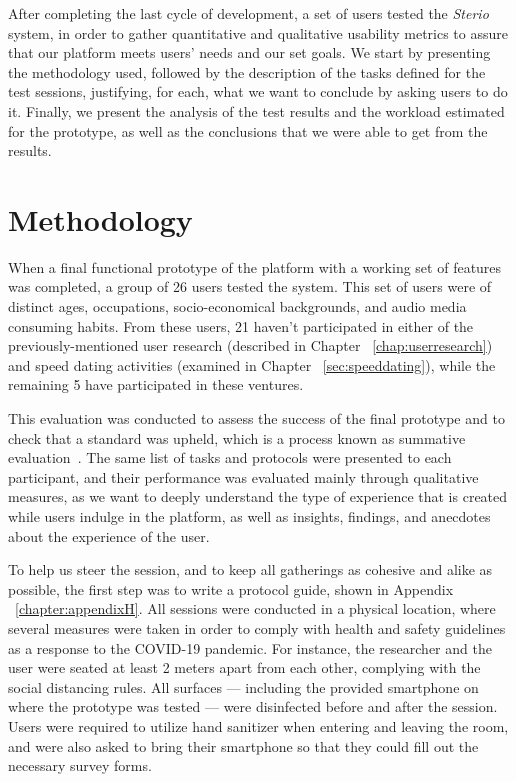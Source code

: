 \label{chap:evaluation}

After completing the last cycle of development, a set of users tested the \textit{Sterio} system, in order to gather quantitative and qualitative usability metrics to assure that our platform meets users’ needs and our set goals. We start by presenting the methodology used, followed by the description of the tasks defined for the test sessions, justifying, for each, what we want to conclude by asking users to do it. Finally, we present the analysis of the test results and the workload estimated for the prototype, as well as the conclusions that we were able to get from the results.


\section{Methodology}

When a final functional prototype of the platform with a working set of features was completed, a group of 26 users tested the system. This set of users were of distinct ages, occupations, socio-economical backgrounds, and audio media consuming habits. From these users, 21 haven't participated in either of the previously-mentioned user research (described in Chapter ~\ref{chap:userresearch}) and speed dating activities (examined in Chapter ~\ref{sec:speeddating}), while the remaining 5 have participated in these ventures.

This evaluation was conducted to assess the success of the final prototype and to check that a standard was upheld, which is a process known as summative evaluation~\cite{Preece2015, Courage2005}. The same list of tasks and protocols were presented to each participant, and their performance was evaluated mainly through qualitative measures, as we want to deeply understand the type of experience that is created while users indulge in the platform, as well as insights, findings, and anecdotes about the experience of the user.

To help us steer the session, and to keep all gatherings as cohesive and alike as possible, the first step was to write a protocol guide, shown in Appendix ~\ref{chapter:appendixH}. All sessions were conducted in a physical location, where several measures were taken in order to comply with health and safety guidelines as a response to the COVID-19 pandemic. For instance, the researcher and the user were seated at least 2 meters apart from each other, complying with the social distancing rules. All surfaces — including the provided smartphone on where the prototype was tested — were disinfected before and after the session. Users were required to utilize hand sanitizer when entering and leaving the room, and were also asked to bring their smartphone so that they could fill out the necessary survey forms. 

